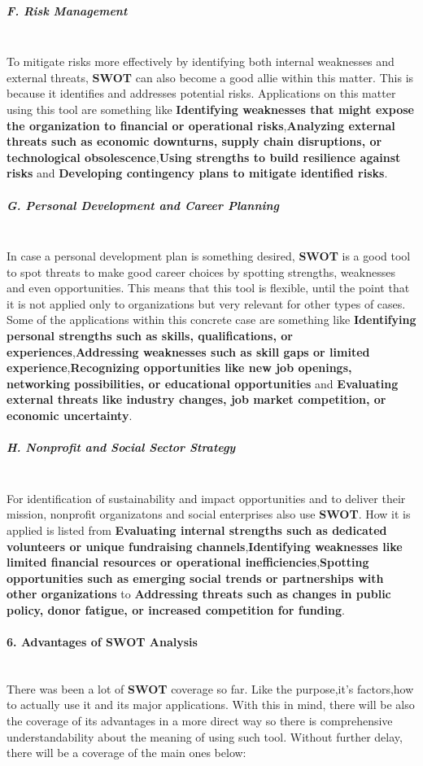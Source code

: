 \subparagraph{F. Risk Management}\mbox{}\\
To mitigate risks more effectively by identifying both internal weaknesses and external threats, \textbf{SWOT} can also become a good allie within this matter. This is because it identifies and addresses potential risks. 
Applications on this matter using this tool are something like \textbf{Identifying weaknesses that might expose the organization to financial or operational risks},\textbf{Analyzing external threats such as economic downturns, supply chain disruptions, or technological obsolescence},\textbf{Using strengths to build resilience against risks} and \textbf{Developing contingency plans to mitigate identified risks}.

\subparagraph{G. Personal Development and Career Planning}\mbox{}\\
In case a personal development plan is something desired, \textbf{SWOT} is a good tool to spot threats to make good career choices by spotting strengths, weaknesses and even opportunities. This means that this tool is flexible, until the point that it is not applied only to organizations but very relevant for other types of cases. Some of the applications within this concrete case are something like \textbf{Identifying personal strengths such as skills, qualifications, or experiences},\textbf{Addressing weaknesses such as skill gaps or limited experience},\textbf{Recognizing opportunities like new job openings, networking possibilities, or educational opportunities} and \textbf{Evaluating external threats like industry changes, job market competition, or economic uncertainty}.

\subparagraph{H. Nonprofit and Social Sector Strategy}\mbox{}\\
For identification of sustainability and impact opportunities and to deliver their mission, nonprofit organizatons and social enterprises also use \textbf{SWOT}. How it is applied is listed from \textbf{Evaluating internal strengths such as dedicated volunteers or unique fundraising channels},\textbf{Identifying weaknesses like limited financial resources or operational inefficiencies},\textbf{Spotting opportunities such as emerging social trends or partnerships with other organizations} to \textbf{Addressing threats such as changes in public policy, donor fatigue, or increased competition for funding}.

\paragraph{6. Advantages of SWOT Analysis}\mbox{}\\
There was been a lot of \textbf{SWOT} coverage so far. Like the purpose,it's factors,how to actually use it and its major applications. With this in mind, there will be also the coverage of its advantages in a more direct way so there is comprehensive understandability about the meaning of using such tool. Without further delay, there will be a coverage of the main ones below:

